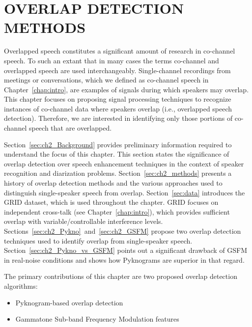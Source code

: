 

\chapter{OVERLAP DETECTION METHODS}
\label{chapter:front-end}
Overlapped speech constitutes a significant amount of research in co-channel speech. 
To such an extant that in many cases the terms co-channel and overlapped speech are used interchangeably. Single-channel recordings from meetings or conversations, which we defined as co-channel speech in Chapter~\ref{chap:intro}, are examples of signals during which speakers may overlap. 
This chapter focuses on proposing signal processing techniques to recognize instances of co-channel data where speakers overlap (i.e., overlapped speech detection). Therefore, we are interested in identifying only those portions of co-channel speech that are overlapped. 

Section~\ref{sec:ch2_Background} provides preliminary information required to understand the focus of this chapter. This section states the significance of overlap detection over speech enhancement techniques in the context of speaker recognition and diarization problems. 
Section~\ref{sec:ch2_methods} presents a history of overlap detection methods and the various approaches used to distinguish single-speaker speech from overlap. 
Section~\ref{sec:data} introduces the GRID dataset, which is used throughout the chapter. 
GRID focuses on independent cross-talk (see Chapter~\ref{chap:intro}), which provides sufficient overlap with variable/controllable interference levels. 
Sections~\ref{sec:ch2_Pykno}~and~\ref{sec:ch2_GSFM} propose two overlap detection techniques used to identify overlap from single-speaker speech. 
Section~\ref{sec:ch2_Pykno_vs_GSFM} points out a significant drawback of GSFM in real-noise conditions and shows how Pyknograms are superior in that regard. 

The primary contributions of this chapter are two proposed overlap detection algorithms: 
\begin{itemize}
	\item Pyknogram-based overlap detection
	\item Gammatone Sub-band Frequency Modulation features
\end{itemize}

\newpage
